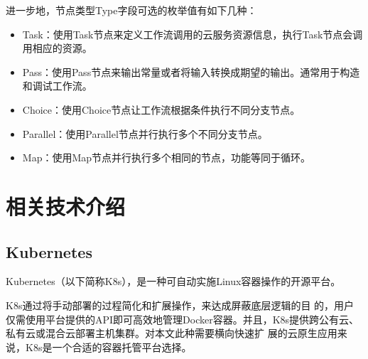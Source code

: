 进一步地，节点类型Type字段可选的枚举值有如下几种：
\begin{itemize}
    \item Task：使用Task节点来定义工作流调用的云服务资源信息，执行Task节点会调用相应的资源。
    \item Pass：使用Pass节点来输出常量或者将输入转换成期望的输出。通常用于构造和调试工作流。
    \item Choice：使用Choice节点让工作流根据条件执行不同分支节点。
    \item Parallel：使用Parallel节点并行执行多个不同分支节点。
    \item Map：使用Map节点并行执行多个相同的节点，功能等同于循环。
\end{itemize}



\section{相关技术介绍}

%
%
%


\subsection{Kubernetes}
Kubernetes（以下简称K8s），是一种可自动实施Linux容器操作的开源平台。

K8s通过将手动部署的过程简化和扩展操作，来达成屏蔽底层逻辑的目
的，用户仅需使用平台提供的API即可高效地管理Docker容器。并且，K8s提供跨公有云、私有云或混合云部署主机集群。对本文此种需要横向快速扩
展的云原生应用来说，K8s是一个合适的容器托管平台选择\cite{zhong2021machine}。

